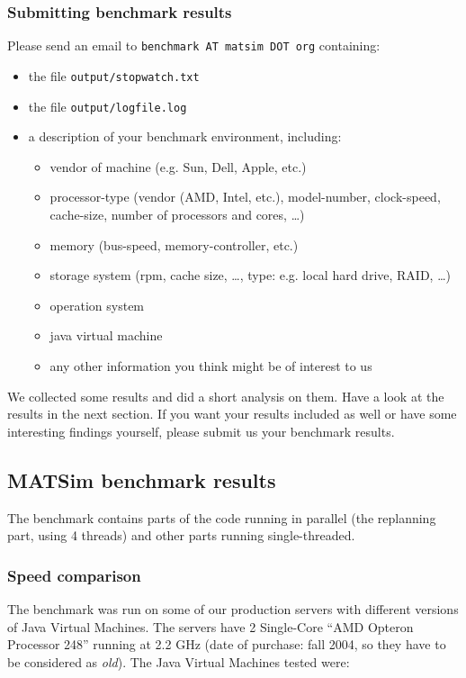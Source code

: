 \subsubsection{Submitting benchmark results}
Please send an email to \texttt{benchmark AT matsim DOT org} containing:
\begin{itemize}
\item the file \texttt{output/stopwatch.txt}
\item the file \texttt{output/logfile.log}
\item a description of your benchmark environment, including:
\begin{itemize}
\item vendor of machine (e.g. Sun, Dell, Apple, etc.)
\item processor-type (vendor (AMD, Intel, etc.), model-number, clock-speed, cache-size, number of processors and cores, \ldots)
\item memory (bus-speed, memory-controller, etc.)
\item storage system (rpm, cache size, \ldots, type: e.g. local hard drive, RAID, \ldots)
\item operation system
\item java virtual machine
\item any other information you think might be of interest to us
\end{itemize}
\end{itemize}

We collected some results and did a short analysis on them. Have a look at the results in the next section. If you want your results included as well or have some interesting findings yourself, please submit us your benchmark results.

\subsection{MATSim benchmark results}
The benchmark contains parts of the code running in parallel (the replanning part, using 4 threads) and other parts running single-threaded.

\subsubsection{Speed comparison}
The benchmark was run on some of our production servers with different versions of Java Virtual Machines. The servers have 2 Single-Core ``AMD Opteron Processor 248'' running at 2.2 GHz (date of purchase: fall 2004, so they have to be considered as \emph{old}). The Java Virtual Machines tested were:

